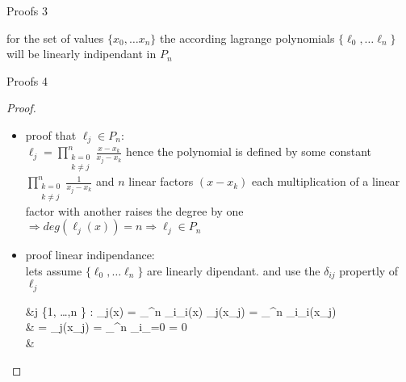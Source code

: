 \documentclass[8pt]{beamer}
\begin{document}
\begin{frame}{Proofs 3}
	\begin{theorem}
		for the set of values $\{x_0, \ldots x_n \}$ the according lagrange polynomials $\{\ell_0, \ldots \ell_n \}$ will be linearly indipendant in $P_n$
	\end{theorem}
\end{frame}

\begin{frame}{Proofs 4}
	 \begin{proof}
		\begin{itemize}
			\item 
				proof that $\ell_j \in P_n$:\\
				$\displaystyle \ell_j = \prod_{\substack{k= 0 \\ k \neq j }}^{n}\frac{x - x_k}{x_j - x_k}$ hence the polynomial is defined by some constant $\displaystyle \prod_{\substack{k= 0 \\ k \neq j }}^{n}\frac{1}{x_j - x_k}$ and $ n$ linear factors $(x-x_k)$ each multiplication of a linear factor with another raises the degree by one $\Rightarrow deg(\ell_j(x)) = n \Rightarrow \ell_j \in P_n$
			 \item proof linear indipendance:\\
			 lets assume $\{\ell_0, \ldots \ell_n \}$ are linearly dipendant. and use the $\delta_{ij}$ propertly of $\ell_j$
			 \begin{flalign*}
			 	&\exists j \in \{1, \ldots ,n \} : \ell_j(x) = \sum_{}^{n} \alpha_i\ell_i(x)
			 	\Rightarrow  \ell_j(x_j) = \sum_{}^{n} \alpha_i\ell_i(x_j)\\
			 	 & = \ell_j(x_j) = \sum_{}^{n} \alpha_i_{=0} = 0 \lightning\\& \Rightarrow {}
			 \end{flalign*}
		\end{itemize}
	 \end{proof}
\end{frame}
\end{document}
